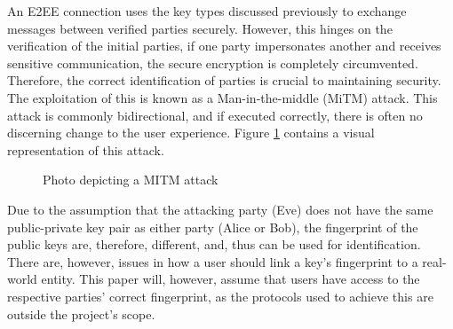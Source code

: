 An E2EE connection uses the key types discussed previously to exchange messages between verified parties securely. However, this hinges on the verification of the initial parties, if one party impersonates another and receives sensitive communication, the secure encryption is completely circumvented. Therefore, the correct identification of parties is crucial to maintaining security. The exploitation of this is known as a Man-in-the-middle (MiTM) attack. This attack is commonly bidirectional, and if executed correctly, there is often no discerning change to the user experience. Figure \ref{fig:mitm} contains a visual representation of this attack.

\begin{center}
    
    \begin{figure}[h]
        \caption{Photo depicting a MITM attack}
        \label{fig:mitm}
    \end{figure}
\end{center}

Due to the assumption that the attacking party (Eve) does not have the same public-private key pair as either party (Alice or Bob), the fingerprint of the public keys are, therefore, different, and, thus can be used for identification. There are, however, issues in how a user should link a key's fingerprint to a real-world entity. This paper will, however, assume that users have access to the respective parties' correct fingerprint, as the protocols used to achieve this are outside the project's scope.

